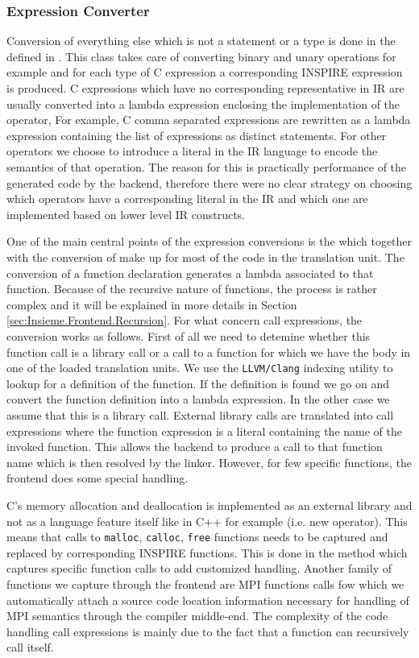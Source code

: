 \subsubsection{Expression Converter}
Conversion of everything else which is not a statement or a type is done in the
 defined in .
This class takes care of converting binary and unary operations for example and
for each type of C expression a corresponding INSPIRE expression is produced. C
expressions which have no corresponding representative in IR are usually
converted into a lambda expression enclosing the implementation of the operator,
For example, C comma separated expressions are rewritten as a lambda expression
containing the list of expressions as distinct statements. For other operators
we choose to introduce a literal in the IR language to encode the semantics of
that operation. The reason for this is practically performance of the generated
code by the backend, therefore there were no clear strategy on choosing which
operators have a corresponding literal in the IR and which one are implemented
based on lower level IR constructs. 

One of the main central points of the expression conversions is the
 which together with the conversion of
 make up for most of the code in the translation unit. The
conversion of a function declaration generates a lambda associated to that
function. Because of the recursive nature of functions, the process is rather
complex and it will be explained in more details in Section
\ref{sec:Insieme.Frontend.Recursion}. For what concern call expressions, the
conversion works as follows. First of all we need to detemine whether this
function call is a library call or a call to a function for which we have the
body in one of the loaded translation units. We use the {\tt LLVM/Clang}
indexing utility to lookup for a definition of the function. If the definition
is found we go on and convert the function definition into a lambda expression.
In the other case we assume that this is a library call. External library calls
are translated into call expressions where the function expression is a literal
containing the name of the invoked function. This allows the backend to produce
a call to that function name which is then resolved by the linker. However, for
few specific functions, the frontend does some special handling.

C's memory allocation and deallocation is implemented as an external library and
not as a language feature itself like in C++ for example (i.e. new operator).
This means that calls to {\tt malloc}, {\tt calloc}, {\tt free} functions needs
to be captured and replaced by corresponding INSPIRE functions. This is done in
the  method which captures specific function calls
to add customized handling. Another family of functions we capture through the
frontend are MPI functions calls fow which we automatically attach a source code
location information necessary for handling of MPI semantics through the
compiler middle-end. The complexity of the code handling call expressions is
mainly due to the fact that a function can recursively call itself. 


